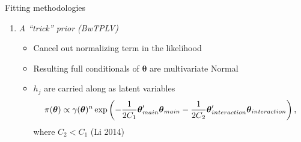 \documentclass[ignorenonframetext,]{beamer}
\providecommand{\tightlist}{%
  \setlength{\itemsep}{0pt}\setlength{\parskip}{0pt}}
\theoremstyle{definition}
\begin{document}
\begin{frame}{Fitting methodologies}
\protect\hypertarget{fitting-methodologies}{}

\begin{enumerate}
\tightlist
\item
  \emph{A ``trick'' prior (BwTPLV)}

  \begin{itemize}
  \tightlist
  \item
    Cancel out normalizing term in the likelihood
  \item
    Resulting full conditionals of \(\boldsymbol \theta\) are
    multivariate Normal
  \item
    \(h_j\) are carried along as latent variables \begin{align*}
     \pi(\boldsymbol \theta) \propto \gamma(\boldsymbol \theta)^n \exp\left(-\frac{1}{2C_{1}}\boldsymbol \theta_{main}'\boldsymbol \theta_{main} -\frac{1}{2C_{2}}\boldsymbol \theta_{interaction}'\boldsymbol \theta_{interaction}\right), \vspace{-.75cm}
     \end{align*} where \(C_{2} < C_{1}\) (Li 2014)
  \end{itemize}
\end{enumerate}

\end{frame}
\end{document}
